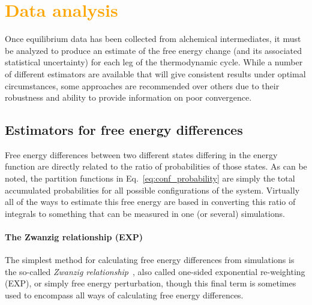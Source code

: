 \documentclass[9pt,bestpractices,pubversion]{livecoms}
\newcommand{\tocorange}[1]{\textcolor{orange}{#1}}
\begin{document}
\section{\tocorange{Data analysis}}
\label{sec:data_analysis}
Once equilibrium data has been collected from alchemical intermediates, it must be analyzed to produce an estimate of the free energy change (and its associated statistical uncertainty) for each leg of the thermodynamic cycle.
While a number of different estimators are available that will give consistent results under optimal circumstances, some approaches are recommended over others due to their robustness and ability to provide information on poor convergence.

\subsection{Estimators for free energy differences}
\label{subsec:estimators}
Free energy differences between two different states differing in the energy function are directly related to the
ratio of probabilities of those states.
As can be noted, the partition functions in Eq.~\ref{eq:conf_probability} are simply the total accumulated probabilities for all possible configurations of the system. Virtually all of the ways to estimate this free energy are based in converting this ratio of integrals to something that can be measured in one (or several) simulations.  

\paragraph{The Zwanzig relationship (EXP)}
The simplest method for calculating free energy differences from simulations is the so-called \textit{Zwanzig
relationship}~\cite{zwanzig1954hightemperature}, also called one-sided exponential re-weighting (EXP), or simply free energy perturbation, though this final term is sometimes used to encompass all ways of calculating free energy differences.
\end{document}
